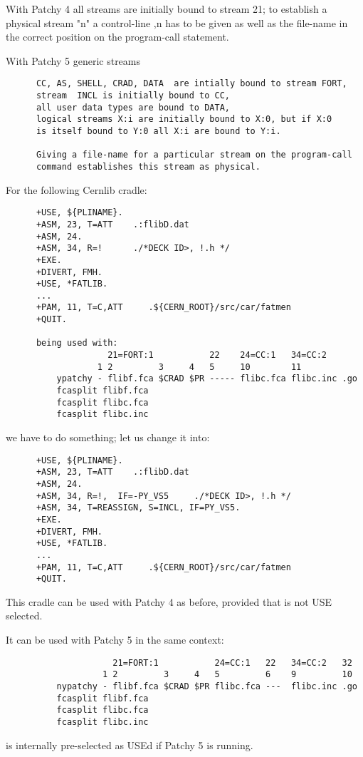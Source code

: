 \begin{enumerate}
With Patchy 4 all streams are initially bound to stream 21; to establish
a physical stream "n" a control-line  ,n  has to be given as well
as the file-name in the correct position on the program-call statement.

With Patchy 5 generic streams
\begin{verbatim}
      CC, AS, SHELL, CRAD, DATA  are intially bound to stream FORT,
      stream  INCL is initially bound to CC,
      all user data types are bound to DATA,
      logical streams X:i are initially bound to X:0, but if X:0
      is itself bound to Y:0 all X:i are bound to Y:i.

      Giving a file-name for a particular stream on the program-call
      command establishes this stream as physical.
\end{verbatim}
For the following Cernlib cradle:
\begin{verbatim}
      +USE, ${PLINAME}.
      +ASM, 23, T=ATT    .:flibD.dat
      +ASM, 24.
      +ASM, 34, R=!      ./*DECK ID>, !.h */
      +EXE.
      +DIVERT, FMH.
      +USE, *FATLIB.
      ...
      +PAM, 11, T=C,ATT     .${CERN_ROOT}/src/car/fatmen
      +QUIT.

      being used with:
                    21=FORT:1           22    24=CC:1   34=CC:2
                  1 2         3     4   5     10        11
          ypatchy - flibf.fca $CRAD $PR ----- flibc.fca flibc.inc .go
          fcasplit flibf.fca
          fcasplit flibc.fca
          fcasplit flibc.inc
\end{verbatim}
   we have to do something; let us change it into:
\begin{verbatim}
      +USE, ${PLINAME}.
      +ASM, 23, T=ATT    .:flibD.dat
      +ASM, 24.
      +ASM, 34, R=!,  IF=-PY_VS5     ./*DECK ID>, !.h */
      +ASM, 34, T=REASSIGN, S=INCL, IF=PY_VS5.
      +EXE.
      +DIVERT, FMH.
      +USE, *FATLIB.
      ...
      +PAM, 11, T=C,ATT     .${CERN_ROOT}/src/car/fatmen
      +QUIT.
\end{verbatim}
This cradle can be used with Patchy 4 as before, provided that
 is not USE selected.

It can be used with Patchy 5 in the same context:
\begin{verbatim}
                     21=FORT:1           24=CC:1   22   34=CC:2   32
                   1 2         3     4   5         6    9         10
          nypatchy - flibf.fca $CRAD $PR flibc.fca ---  flibc.inc .go
          fcasplit flibf.fca
          fcasplit flibc.fca
          fcasplit flibc.inc
\end{verbatim}
 is internally pre-selected as USEd if Patchy 5 is running.
\end{enumerate}

